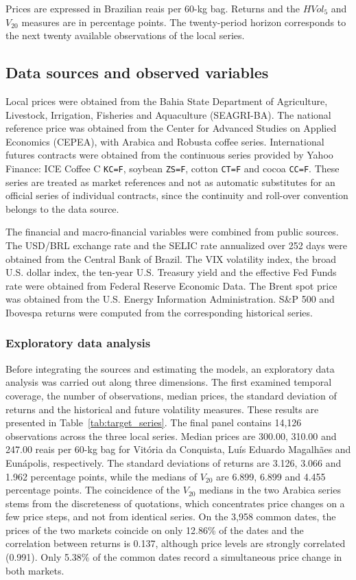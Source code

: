 \documentclass[a4paper,fleqn]{cas-sc}
\begin{document}
Prices are expressed in Brazilian reais per 60-kg bag. Returns and the \(HVol_{5}\) and \(V_{20}\) measures are in percentage points. The twenty-period horizon corresponds to the next twenty available observations of the local series.

\subsection{Data sources and observed variables}
\label{subsec:data_sources}

Local prices were obtained from the Bahia State Department of Agriculture, Livestock, Irrigation, Fisheries and Aquaculture (SEAGRI-BA). The national reference price was obtained from the Center for Advanced Studies on Applied Economics (CEPEA), with Arabica and Robusta coffee series. International futures contracts were obtained from the continuous series provided by Yahoo Finance: ICE Coffee C \texttt{KC=F}, soybean \texttt{ZS=F}, cotton \texttt{CT=F} and cocoa \texttt{CC=F}. These series are treated as market references and not as automatic substitutes for an official series of individual contracts, since the continuity and roll-over convention belongs to the data source.

The financial and macro-financial variables were combined from public sources. The USD/BRL exchange rate and the SELIC rate annualized over 252 days were obtained from the Central Bank of Brazil. The VIX volatility index, the broad U.S. dollar index, the ten-year U.S. Treasury yield and the effective Fed Funds rate were obtained from Federal Reserve Economic Data. The Brent spot price was obtained from the U.S. Energy Information Administration. S\&P 500 and Ibovespa returns were computed from the corresponding historical series.

\subsubsection{Exploratory data analysis}
\label{subsec:eda}

Before integrating the sources and estimating the models, an exploratory data analysis was carried out along three dimensions. The first examined temporal coverage, the number of observations, median prices, the standard deviation of returns and the historical and future volatility measures. These results are presented in Table~\ref{tab:target_series}. The final panel contains 14,126 observations across the three local series. Median prices are 300.00, 310.00 and 247.00 reais per 60-kg bag for Vitória da Conquista, Luís Eduardo Magalhães and Eunápolis, respectively. The standard deviations of returns are 3.126, 3.066 and 1.962 percentage points, while the medians of \(V_{20}\) are 6.899, 6.899 and 4.455 percentage points. The coincidence of the \(V_{20}\) medians in the two Arabica series stems from the discreteness of quotations, which concentrates price changes on a few price steps, and not from identical series. On the 3,958 common dates, the prices of the two markets coincide on only 12.86\% of the dates and the correlation between returns is 0.137, although price levels are strongly correlated (0.991). Only 5.38\% of the common dates record a simultaneous price change in both markets.
\end{document}
